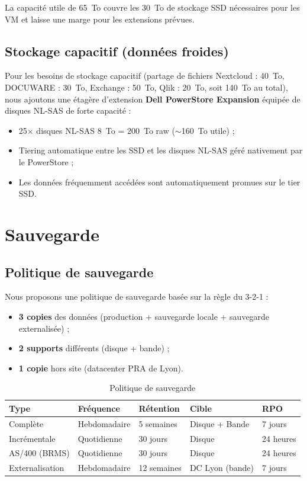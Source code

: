 \documentclass[12pt,a4paper]{report}
\begin{document}
La capacité utile de 65~To couvre les 30~To de stockage SSD nécessaires pour les VM et laisse une marge pour les extensions prévues.

\subsection{Stockage capacitif (données froides)}

Pour les besoins de stockage capacitif (partage de fichiers Nextcloud : 40~To, DOCUWARE : 30~To, Exchange : 50~To, Qlik : 20~To, soit 140~To au total), nous ajoutons une étagère d'extension \textbf{Dell PowerStore Expansion} équipée de disques NL-SAS de forte capacité :

\begin{itemize}
\item 25$\times$ disques NL-SAS 8~To = 200~To raw ($\sim$160~To utile) ;
\item Tiering automatique entre les SSD et les disques NL-SAS géré nativement par le PowerStore ;
\item Les données fréquemment accédées sont automatiquement promues sur le tier SSD.
\end{itemize}

\section{Sauvegarde}

\subsection{Politique de sauvegarde}

Nous proposons une politique de sauvegarde basée sur la règle du 3-2-1 :

\begin{itemize}
\item \textbf{3 copies} des données (production + sauvegarde locale + sauvegarde externalisée) ;
\item \textbf{2 supports} différents (disque + bande) ;
\item \textbf{1 copie} hors site (datacenter PRA de Lyon).
\end{itemize}

\begin{table}[H]
\centering
\begin{tabularx}{\textwidth}{@{}L{3cm}C{2.6cm}C{2.4cm}C{3.2cm}C{2cm}@{}}
\toprule
\textbf{Type} & \textbf{Fréquence} & \textbf{Rétention} & \textbf{Cible} & \textbf{RPO} \\
\midrule
Complète & Hebdomadaire & 5 semaines & Disque + Bande & 7 jours \\
Incrémentale & Quotidienne & 30 jours & Disque & 24 heures \\
AS/400 (BRMS) & Quotidienne & 30 jours & Disque & 24 heures \\
Externalisation & Hebdomadaire & 12 semaines & DC Lyon (bande) & 7 jours \\
\bottomrule
\end{tabularx}
\caption{Politique de sauvegarde}
\label{tab:sauvegarde}
\end{table}
\end{document}
